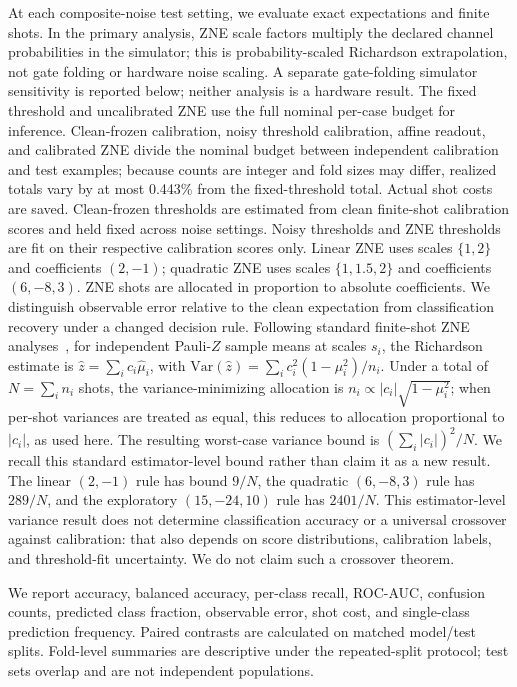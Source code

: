 \documentclass[conference]{IEEEtran}
\begin{document}
At each composite-noise test setting, we evaluate exact expectations and finite shots. In the primary analysis, ZNE scale factors multiply the declared channel probabilities in the simulator; this is probability-scaled Richardson extrapolation, not gate folding or hardware noise scaling. A separate gate-folding simulator sensitivity is reported below; neither analysis is a hardware result. The fixed threshold and uncalibrated ZNE use the full nominal per-case budget for inference. Clean-frozen calibration, noisy threshold calibration, affine readout, and calibrated ZNE divide the nominal budget between independent calibration and test examples; because counts are integer and fold sizes may differ, realized totals vary by at most 0.443\% from the fixed-threshold total. Actual shot costs are saved. Clean-frozen thresholds are estimated from clean finite-shot calibration scores and held fixed across noise settings. Noisy thresholds and ZNE thresholds are fit on their respective calibration scores only. Linear ZNE uses scales $\{1,2\}$ and coefficients $(2,-1)$; quadratic ZNE uses scales $\{1,1.5,2\}$ and coefficients $(6,-8,3)$. ZNE shots are allocated in proportion to absolute coefficients. We distinguish observable error relative to the clean expectation from classification recovery under a changed decision rule. Following standard finite-shot ZNE analyses~\cite{scavino2026,mohammadipourli2025}, for independent Pauli-$Z$ sample means at scales $s_i$, the Richardson estimate is $\hat z=\sum_i c_i\hat\mu_i$, with $\mathrm{Var}(\hat z)=\sum_i c_i^2(1-\mu_i^2)/n_i$. Under a total of $N=\sum_i n_i$ shots, the variance-minimizing allocation is $n_i\propto |c_i|\sqrt{1-\mu_i^2}$; when per-shot variances are treated as equal, this reduces to allocation proportional to $|c_i|$, as used here. The resulting worst-case variance bound is $(\sum_i|c_i|)^2/N$. We recall this standard estimator-level bound rather than claim it as a new result. The linear $(2,-1)$ rule has bound $9/N$, the quadratic $(6,-8,3)$ rule has $289/N$, and the exploratory $(15,-24,10)$ rule has $2401/N$. This estimator-level variance result does not determine classification accuracy or a universal crossover against calibration: that also depends on score distributions, calibration labels, and threshold-fit uncertainty. We do not claim such a crossover theorem.

We report accuracy, balanced accuracy, per-class recall, ROC-AUC, confusion counts, predicted class fraction, observable error, shot cost, and single-class prediction frequency. Paired contrasts are calculated on matched model/test splits. Fold-level summaries are descriptive under the repeated-split protocol; test sets overlap and are not independent populations.
\end{document}
